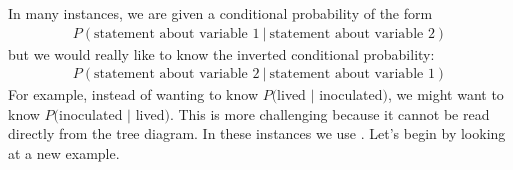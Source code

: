 
In many instances, we are given a conditional probability of the form
\begin{align*}
P(\text{statement about variable 1}\ |\ \text{statement about variable 2})
\end{align*}
but we would really like to know the inverted conditional probability:
\begin{align*}
P(\text{statement about variable 2}\ |\ \text{statement about variable 1})
\end{align*}
For example, instead of wanting to know $P($lived $|$ inoculated$)$, we might want to know $P($inoculated $|$ lived$)$. This is more challenging because it cannot be read directly from the tree diagram. In these instances we use . Let's begin by looking at a new example.

\D{\newpage}

